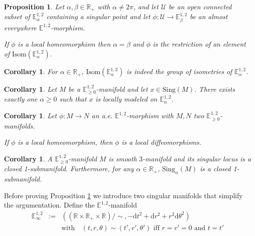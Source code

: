 \documentclass[a4paper,12pt]{article}
\def\U{\mathcal U}
\def\isom{Isom}
\def\R{\mathbb{R}}
\def\E{\mathbf E}
\def\d{\mathrm{d}}
\def\E{\mathbb{E}}
\def\sing{\mathrm{Sing}}
\def\RR{\mathbb{R}}
\newcommand{\mass}[1]{{\mathbb E}^{1,2}_{#1}}
\def\isom{\mathrm{Isom}}
\newtheorem{propou}[lemou]{Proposition}
\newtheorem{corou}[lemou]{Corollary}
\begin{document}
  \begin{propou} \label{prop:isom} Let $\alpha,\beta\in \R_+$  with $\alpha\neq 2\pi$, and let $\U$ be an open connected
	  subset of $\E^{1,2}_\alpha$ containing a singular point
	  and let $\phi:\U\rightarrow \E^{1,2}_\beta$ be an  almost everywhere $\mass{}$-morphism. 
	  
	 If $\phi$ is a local homeomorphism then $\alpha=\beta$ and  
	  $\phi$ is the restriction of an element of $\isom(\E^{1,2}_\alpha)$. 
 \end{propou}
\begin{corou}
For $\alpha\in \RR_+$, $\isom(\mass{\alpha})$ is indeed the group of isometries of $\mass{\alpha}$.
\end{corou}
\begin{corou}
	Let $M$ be a $\mass{\geq 0}$-manifold and let $x\in \sing(M)$. There exists exactly one $\alpha\geq 0$ such that $x$ is locally modeled on $\mass{\alpha}$.
\end{corou}
\begin{corou} Let $\phi:M\rightarrow N$ an a.e. $\mass{}$-morphism with $M,N$ two $\mass{\geq0}$-manifolds. 

If $\phi$ is a local homeomorphism, then $\phi$ is a local diffeomorphisms.
\end{corou}
\begin{corou}A $\mass{\geq 0}$-manifold $M$ is smooth $3$-manifold and its singular locus is a closed 1-submanifold. Furthermore, for any $\alpha\in \RR_+$, $\sing_\alpha(M)$ is a closed 1-submanifold.

\end{corou}


Before proving Proposition \ref{prop:isom} we introduce two singular manifolds that simplify the argumentation. Define the $\mass{}$-manifold \begin{eqnarray*}
	\mass{\infty}&:=& \left((\RR\times \RR_+\times \RR)/\sim, -\d t^2+\d r^2+r^2\d\theta^2\right) \\ && \text{with} \quad  (t,r,\theta)\sim (t',r',\theta') \text{ iff } r=r'=0 \text{ and } t=t'
\end{eqnarray*}
\end{document}
